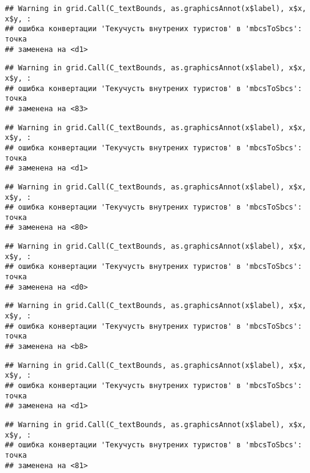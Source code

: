 \documentclass[
]{article}
\begin{document}
\begin{verbatim}
## Warning in grid.Call(C_textBounds, as.graphicsAnnot(x$label), x$x, x$y, :
## ошибка конвертации 'Текучусть внутрених туристов' в 'mbcsToSbcs': точка
## заменена на <d1>
\end{verbatim}

\begin{verbatim}
## Warning in grid.Call(C_textBounds, as.graphicsAnnot(x$label), x$x, x$y, :
## ошибка конвертации 'Текучусть внутрених туристов' в 'mbcsToSbcs': точка
## заменена на <83>
\end{verbatim}

\begin{verbatim}
## Warning in grid.Call(C_textBounds, as.graphicsAnnot(x$label), x$x, x$y, :
## ошибка конвертации 'Текучусть внутрених туристов' в 'mbcsToSbcs': точка
## заменена на <d1>
\end{verbatim}

\begin{verbatim}
## Warning in grid.Call(C_textBounds, as.graphicsAnnot(x$label), x$x, x$y, :
## ошибка конвертации 'Текучусть внутрених туристов' в 'mbcsToSbcs': точка
## заменена на <80>
\end{verbatim}

\begin{verbatim}
## Warning in grid.Call(C_textBounds, as.graphicsAnnot(x$label), x$x, x$y, :
## ошибка конвертации 'Текучусть внутрених туристов' в 'mbcsToSbcs': точка
## заменена на <d0>
\end{verbatim}

\begin{verbatim}
## Warning in grid.Call(C_textBounds, as.graphicsAnnot(x$label), x$x, x$y, :
## ошибка конвертации 'Текучусть внутрених туристов' в 'mbcsToSbcs': точка
## заменена на <b8>
\end{verbatim}

\begin{verbatim}
## Warning in grid.Call(C_textBounds, as.graphicsAnnot(x$label), x$x, x$y, :
## ошибка конвертации 'Текучусть внутрених туристов' в 'mbcsToSbcs': точка
## заменена на <d1>
\end{verbatim}

\begin{verbatim}
## Warning in grid.Call(C_textBounds, as.graphicsAnnot(x$label), x$x, x$y, :
## ошибка конвертации 'Текучусть внутрених туристов' в 'mbcsToSbcs': точка
## заменена на <81>
\end{verbatim}
\end{document}
